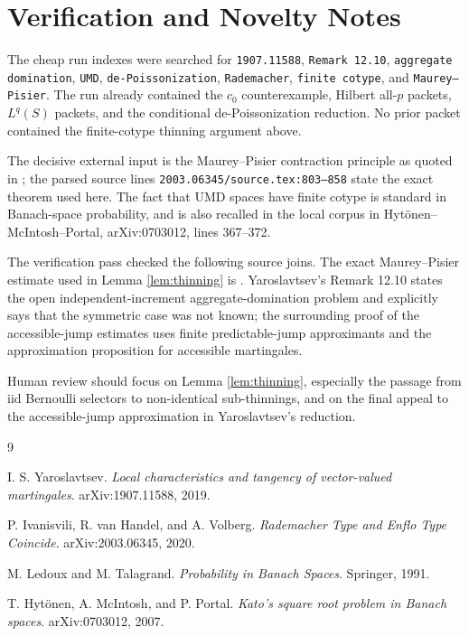 \documentclass[11pt]{article}
\newcommand{\1}{\mathbf 1}
\begin{document}
\section*{Verification and Novelty Notes}

The cheap run indexes were searched for \texttt{1907.11588},
\texttt{Remark 12.10}, \texttt{aggregate domination}, \texttt{UMD},
\texttt{de-Poissonization}, \texttt{Rademacher}, \texttt{finite cotype}, and
\texttt{Maurey--Pisier}.  The run already contained the \(c_0\)
counterexample, Hilbert all-\(p\) packets, \(L^q(S)\) packets, and the
conditional de-Poissonization reduction.  No prior packet contained the
finite-cotype thinning argument above.

The decisive external input is the Maurey--Pisier contraction principle as
quoted in \cite[Theorem 4.1]{IvanisviliVanHandelVolberg2020}; the parsed
source lines \texttt{2003.06345/source.tex:803--858} state the exact theorem
used here.  The fact that UMD spaces have finite cotype is standard in
Banach-space probability, and is also recalled in the local corpus in
Hyt\"onen--McIntosh--Portal, arXiv:0703012, lines 367--372.

The verification pass checked the following source joins.  The exact
Maurey--Pisier estimate used in Lemma \ref{lem:thinning} is
\cite[Theorem 4.1]{IvanisviliVanHandelVolberg2020}.  Yaroslavtsev's
Remark 12.10 states the open independent-increment aggregate-domination problem
and explicitly says that the symmetric case was not known; the surrounding
proof of the accessible-jump estimates uses finite predictable-jump
approximants and the approximation proposition for accessible martingales.

Human review should focus on Lemma \ref{lem:thinning}, especially the passage
from iid Bernoulli selectors to non-identical sub-thinnings, and on the final
appeal to the accessible-jump approximation in Yaroslavtsev's reduction.

\begin{thebibliography}{9}

I. S. Yaroslavtsev.
\newblock \emph{Local characteristics and tangency of vector-valued martingales}.
\newblock arXiv:1907.11588, 2019.

P. Ivanisvili, R. van Handel, and A. Volberg.
\newblock \emph{Rademacher Type and Enflo Type Coincide}.
\newblock arXiv:2003.06345, 2020.

M. Ledoux and M. Talagrand.
\newblock \emph{Probability in Banach Spaces}.
\newblock Springer, 1991.

T. Hyt\"onen, A. McIntosh, and P. Portal.
\newblock \emph{Kato's square root problem in Banach spaces}.
\newblock arXiv:0703012, 2007.

\end{thebibliography}
\end{document}
